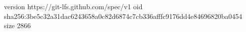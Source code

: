 version https://git-lfs.github.com/spec/v1
oid sha256:3be5c32a31dac6243658a0c82d6874c7cb336afffc9176dd4e84696820ba0454
size 2866

